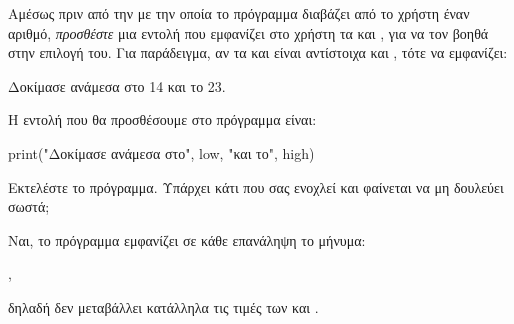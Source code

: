 \documentclass[a4paper,11pt,oneside]{book}
\begin{document}
\begin{step}
Αμέσως πριν από την  με την οποία το πρόγραμμα διαβάζει από το χρήστη έναν αριθμό, \emph{προσθέστε} μια εντολή που εμφανίζει στο χρήστη τα  και , για να τον βοηθά στην επιλογή του. Για παράδειγμα, αν τα  και  είναι αντίστοιχα  και , τότε να εμφανίζει:

\marginnote[24pt]{\iconcomputer}
\begin{pyterm}
Δοκίμασε ανάμεσα στο 14 και το 23.
\end{pyterm}

\begin{answer}
	Η εντολή που θα προσθέσουμε στο πρόγραμμα είναι:
	
	\begin{pynew}
print("Δοκίμασε ανάμεσα στο", low, "και το", high)
	\end{pynew}
\end{answer}

Εκτελέστε το πρόγραμμα. Υπάρχει κάτι που σας ενοχλεί και φαίνεται να μη δουλεύει σωστά;

\begin{answer}
	Ναι, το πρόγραμμα εμφανίζει σε κάθε επανάληψη το μήνυμα:
	
	, 
	
	δηλαδή δεν μεταβάλλει κατάλληλα τις τιμές των  και .
\end{answer}
\end{step}
\end{document}
